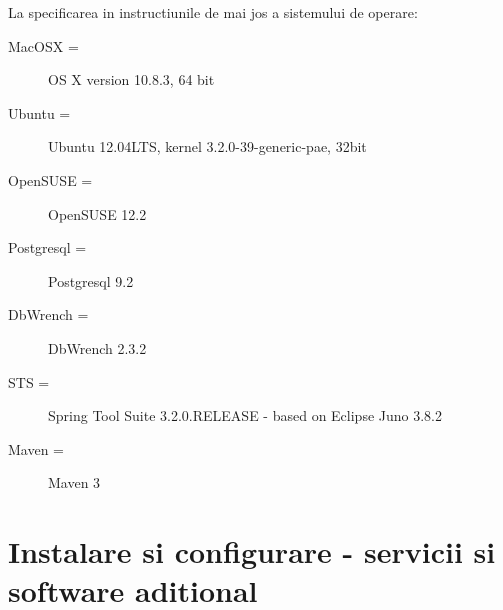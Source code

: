 La specificarea in instructiunile de mai jos a sistemului de operare:
\begin{description} 
\item [MacOSX =] OS X version 10.8.3, 64 bit
\item [Ubuntu =] Ubuntu 12.04LTS, kernel 3.2.0-39-generic-pae, 32bit
\item [OpenSUSE = ] OpenSUSE 12.2
\item [Postgresql =] Postgresql 9.2
\item [DbWrench =] DbWrench 2.3.2
\item [STS =] Spring Tool Suite 3.2.0.RELEASE - based on Eclipse Juno 3.8.2
\item [Maven =] Maven 3
\end{description}

\section{Instalare si configurare - servicii si software aditional}

